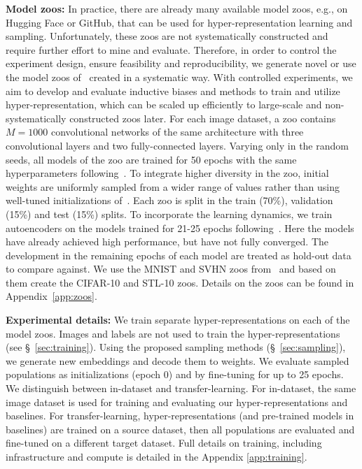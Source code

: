\documentclass{article}
\begin{document}
\textbf{Model zoos:} 
In practice, there are already many available model zoos, e.g., on Hugging Face or GitHub, that can be used for hyper-representation learning and sampling. 
Unfortunately, these zoos are not systematically constructed and require further effort to mine and evaluate.
Therefore, in order to control the experiment design, ensure feasibility and reproducibility, we generate novel or use the model zoos of~\citep{schurholtSelfSupervisedRepresentationLearning2021,schurholtModelZoosDataset2022} created in a systematic way.
With controlled experiments, we aim to develop and evaluate inductive biases and methods to train and utilize hyper-representation, which can be scaled up efficiently to large-scale and non-systematically constructed zoos later. %
For each image dataset, a zoo contains $M=1000$ convolutional networks of the same architecture with three convolutional layers and two fully-connected layers. 
Varying only in the random seeds, all models of the zoo are trained for 50 epochs with the same hyperparameters following~\citep{schurholtSelfSupervisedRepresentationLearning2021}. 
To integrate higher diversity in the zoo, initial weights are uniformly sampled from a wider range of values rather than using well-tuned initializations of~\citep{glorotUnderstandingDifﬁcultyTraining2010,heDelvingDeepRectifiers2015}.
Each zoo is split in the train (70\%), validation (15\%) and test (15\%) splits. 
To incorporate the learning dynamics, we train autoencoders on the models trained for
21-25 epochs following~\citep{schurholtSelfSupervisedRepresentationLearning2021}. Here the models have already achieved high performance, but have not fully converged. The development in the remaining epochs of each model are treated as hold-out data to compare against. 
We use the MNIST and SVHN zoos from~\citep{schurholtSelfSupervisedRepresentationLearning2021} and based on them create the CIFAR-10 and STL-10 zoos. Details on the zoos can be found in Appendix~\ref{app:zoos}.

\textbf{Experimental details:} We train separate hyper-representations on each of the model zoos. Images and labels are not used to train the hyper-representations (see \S~\ref{sec:training}).
Using the proposed sampling methods (\S~\ref{sec:sampling}), we generate new embeddings and decode them to weights. We evaluate sampled populations as initializations (epoch 0) and by fine-tuning for up to 25 epochs.
We distinguish between in-dataset and transfer-learning. 
For in-dataset, the same image dataset is used for training and evaluating our hyper-representations and baselines.
For transfer-learning, hyper-representations (and pre-trained models in baselines) are trained on a source dataset, then all populations are evaluated and fine-tuned on a different target dataset. 
Full details on training, including infrastructure and compute is detailed in the Appendix  \ref{app:training}.
%
%
\end{document}
